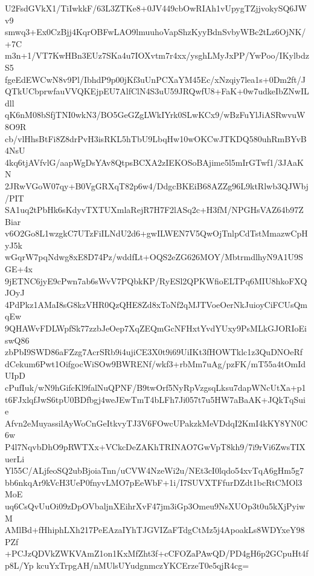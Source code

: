 U2FsdGVkX1/TiIwkkF/63L3ZTKe8+0JV449cbOwRIAh1vUpygTZjjvokySQ6JWv9
smwq3+Ex0CzBjj4KqrOBFwLAO9lmuuhoVapShzKyyBdnSvbyWBc2tLz6OjNK/+7C
m3n+1/VT7KwHBn3EUz7SKa4u7IOXvtm7r4xx/ysghLMyJxPP/YwPoo/IKylbdzS5
fgeEdEWCwN8v9Pl/IbhdP9p00jKf3uUnPCXaYM45Ec/xNzqiy7lea1s+0Dm2ft/J
QTkUCbprwfauVVQKEjpEU7AlfClN4S3uU59JRQwfU8+FaK+0w7udkeIbZNwILdll
qK6nM08bSfjTNI0wkN3/BO5GeGZgLWkIYrk0SLwKCx9/wBzFuYlJiASRwvuW8O9R
cb/vlHhsBtFi8Z8drPvH3isRKL5hTbU9LbqHw10wOKCwJTKDQ580uhRmBYvB4NsU
4kq6tjAVfvlG/aapWgDsYAv8QtpsBCXA2zIEKOSoBAjime5l5mIrGTwf1/3JAaKN
2JRwVGoW07qy+B0VgGRXqT82p6w4/DdgcBKEiB68AZZg96L9ktRlwb3QJWbj/PIT
SA1uq2tPbHk6sKdyvTXTUXmlaRejR7H7F2lASq2c+H3fM/NPGHsVAZ64b97ZBiar
v6O2Go8L1wzgkC7UTzFiILNdU2d6+gwILWEN7V5QwOjTnlpCdTstMmazwCpHyJ5k
wGqrW7pqNdwg8xE8D74Pz/wddfLt+OQS2eZG626MOY/MbtrmdlhyN9A1U9SGE+4x
9jETNC6jyE9cPwn7ab6sWvV7PQbkKP/RyESl2QPKWfioELTPq6MIU8hkoFXQJOyJ
4PdPkz1AMaI8sG8kzVHR0QzQHE8Zd8xToNf2qMJTVoeOerNkJuioyCiFCUsQmqEw
9QHAWvFDLWpfSk77zzbJeOep7XqZEQmGcNFHxtYvdYUxy9PsMLkGJORIoEiswQ86
zbPbI9SWD86aFZzg7AcrSRb9i4ujiCE3X0t9i69UiIKt3fHOWTklc1z3QuDNOeRf
dCekum6Pwt1OifgocWiSOw9BWRENf/wkf3+rbMm7uAg/pzFK/mT55a4tOmIdUIpD
cPufIuk/wN9hGifcKl9falNuQPNF/B9twOrf5NyRpVzgsqLksu7dapWNcUtXa+p1
t6FJxlqfJwS6tpU0BDfbgj4weJEwTmT4bLFh7Ji057t7u5HW7aBaAK+JQkTqSuie
Afvn2eMuyassilAyWoCnGeItkvyTJ3V6FOwcUPakzkMeVDdqI2KmI4kKY8YN0C6w
P4l7NqvbDhO9pRWTXx+VCkcDeZAKhTRINAO7GwVpT8kh9/7i9rVi6ZwsTIXuerLi
Yl55C/ALjfeoSQ2ubBjoiaTnn/uCVW4NzeWi2u/NEt3cI0lqdo54xvTqA6gHm5g7
bb6nkqAr9kVcH3UeP0fnyvLMO7pEeWbF+1i/I7SUVXTFfurDZdt1bcRtCMOl3MoE
uq6CsQvUuOi09zDpOVbaljnXEihrXvF47jm3iGp3Omeu9NsXUOp3t0u5kXjPyiwM
AMlBd+fHhiphLXh217PeEAzaIYhTJGVIZaFTdgCtMz5j4ApoakLs8WDYxeY98PZf
+PCJzQDVkZWKVAmZ1on1KxMfZht3f+cCFOZaPAwQD/PD4gH6p2GCpuHt4fp8L/Yp
kcuYxTrpgAH/nMUlsUYudgnmczYKCErzeT0e5qjR4cg=
